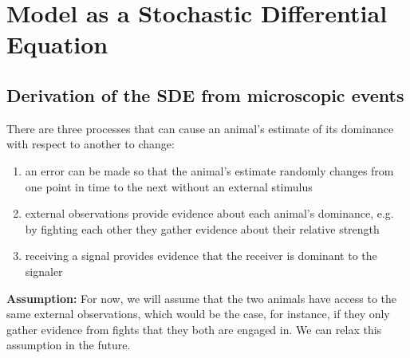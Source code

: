 \documentclass{article}
\begin{document}
\section{Model as a Stochastic Differential Equation}

\subsection{Derivation of the SDE from microscopic events }
There are three processes that can cause an animal's estimate of its dominance with respect to another to change:
\begin{enumerate}
\item an error can be made so that the animal's estimate randomly changes from one point in time to the next without an external stimulus

\item external observations provide evidence about each animal's dominance, e.g. by fighting each other they gather evidence about their relative strength

\item receiving a signal provides evidence that the receiver is dominant to the signaler

\end{enumerate}
{\bf Assumption:} For now, we will assume that the two animals have access to the same external observations, which would be the case, for instance, if they only gather evidence from fights that they both are engaged in.  We can relax this assumption in the future.
\end{document}
